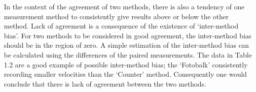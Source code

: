 \documentclass[12pt, a4paper]{report}
\theoremstyle{plain}
\theoremstyle{definition}
\theoremstyle{remark}
\begin{document}
	
	In the context of the agreement of two methods, there is also a
	tendency of one measurement method to consistently give results
	above or below the other method. Lack of agreement is a
	consequence of the existence of `inter-method bias'. For two
	methods to be considered in good agreement, the inter-method bias
	should be in the region of zero. A simple estimation of the
	inter-method bias can be calculated using the differences of the
	paired measurements. The data in Table 1.2 are a good example of
	possible inter-method bias; the `Fotobalk' consistently recording
	smaller velocities than the `Counter' method. Consequently one
	would conclude that there is lack of agreement between the two
	methods.
	
\end{document}
